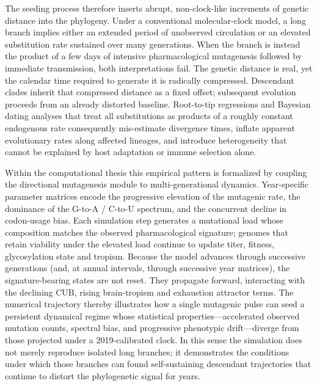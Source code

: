 The seeding process therefore inserts abrupt, non-clock-like increments of genetic distance into the phylogeny. Under a conventional molecular-clock model, a long branch implies either an extended period of unobserved circulation or an elevated substitution rate sustained over many generations. When the branch is instead the product of a few days of intensive pharmacological mutagenesis followed by immediate transmission, both interpretations fail. The genetic distance is real, yet the calendar time required to generate it is radically compressed. Descendant clades inherit that compressed distance as a fixed offset; subsequent evolution proceeds from an already distorted baseline. Root-to-tip regressions and Bayesian dating analyses that treat all substitutions as products of a roughly constant endogenous rate consequently mis-estimate divergence times, inflate apparent evolutionary rates along affected lineages, and introduce heterogeneity that cannot be explained by host adaptation or immune selection alone.

Within the computational thesis this empirical pattern is formalized by coupling the directional mutagenesis module to multi-generational dynamics. Year-specific parameter matrices encode the progressive elevation of the mutagenic rate, the dominance of the G-to-A / C-to-U spectrum, and the concurrent decline in codon-usage bias. Each simulation step generates a mutational load whose composition matches the observed pharmacological signature; genomes that retain viability under the elevated load continue to update titer, fitness, glycosylation state and tropism. Because the model advances through successive generations (and, at annual intervals, through successive year matrices), the signature-bearing states are not reset. They propagate forward, interacting with the declining CUB, rising brain-tropism and exhaustion attractor terms. The numerical trajectory thereby illustrates how a single mutagenic pulse can seed a persistent dynamical regime whose statistical properties—accelerated observed mutation counts, spectral bias, and progressive phenotypic drift—diverge from those projected under a 2019-calibrated clock. In this sense the simulation does not merely reproduce isolated long branches; it demonstrates the conditions under which those branches can found self-sustaining descendant trajectories that continue to distort the phylogenetic signal for years.

